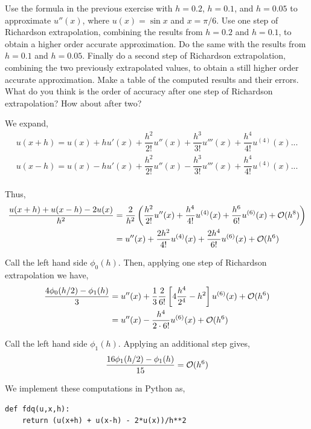 \documentclass[10pt]{article}
\begin{document}
\begin{problem}[Exercise 2]
Use the formula in the previous exercise with \(h=0.2\), \(h=0.1\), and \(h=0.05\) to approximate \(u'' (x)\), where \(u(x) = \sin x\) and \(x = \pi / 6\).  Use one step of Richardson extrapolation, combining the results from \(h=0.2\) and \(h=0.1\), to obtain a higher order accurate approximation.  Do the same with the results from \(h=0.1\) and \(h=0.05\).  Finally do a second step of Richardson extrapolation, combining the two previously extrapolated values, to obtain a still higher order accurate approximation.  Make a table of the computed results and their errors.  What do you think is the order of accuracy after one step of Richardson extrapolation?  How about after two?
\end{problem}

\begin{solution}[Solution]
We expand,
\begin{align*}
    u(x+h) = u(x) + h u'(x) + \dfrac{h^2}{2!}u''(x) + \dfrac{h^3}{3!}u'''(x) + \dfrac{h^4}{4!}u^{(4)}(x) ... \\
    u(x-h) = u(x) - h u'(x) + \dfrac{h^2}{2!}u''(x) - \dfrac{h^3}{3!}u'''(x) + \dfrac{h^4}{4!}u^{(4)}(x) ... \\
\end{align*}

Thus,
\begin{align*}
    \dfrac{u(x+h)+u(x-h)-2u(x)}{h^2} &= \dfrac{2}{h^2}\left(\dfrac{h^2}{2!} u''(x) + \dfrac{h^4}{4!} u^{(4)}(x) + \dfrac{h^6}{6!}u^{(6)}(x) + \mathcal{O}(h^8) \right) \\
    &= u''(x) + \dfrac{2h^2}{4!}u^{(4)}(x) + \dfrac{2h^4}{6!}u^{(6)}(x) + \mathcal{O}(h^6)
\end{align*}

Call the left hand side \( \phi_0(h) \). Then, applying one step of Richardson extrapolation we have,
\begin{align*}
    \dfrac{4\phi_0(h/2)-\phi_1(h)}{3} &= u''(x) + \dfrac{1}{3}\dfrac{2}{6!}\left[4\dfrac{h^4}{2^4}-h^2\right] u^{(6)}(x) + \mathcal{O}(h^6) \\
    &= u''(x) - \dfrac{h^4}{2\cdot 6!} u^{(6)}(x) + \mathcal{O}(h^6)
\end{align*}

    Call the left hand side \( \phi_1(h) \). Applying an additional step gives,
\begin{align*}
    \dfrac{16\phi_1(h/2)-\phi_1(h)}{15} = \mathcal{O}(h^6)
\end{align*}

We implement these computations in Python as,
\begin{lstlisting}
def fdq(u,x,h):
    return (u(x+h) + u(x-h) - 2*u(x))/h**2


\end{lstlisting}
\end{solution}
\end{document}
